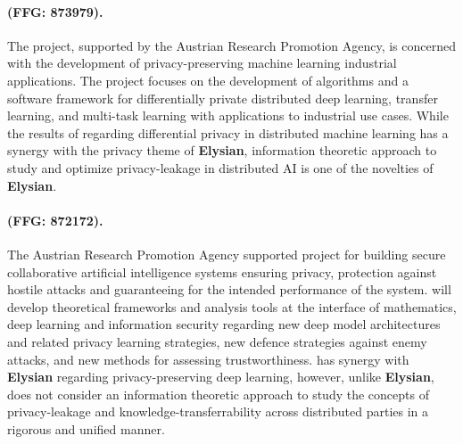 \documentclass[a4paper,11pt]{article}
\newcommand{\project}[1]{\textbf{#1}\xspace}
\newcommand{\SECURITY}{\project{Elysian}}
\newcommand{\TheProject}{\SECURITY}
\begin{document}
\begin{mdframed}[backgroundcolor=blue!5]
\paragraph{\primal (FFG: 873979).}
The \primal project, supported by the Austrian Research Promotion Agency, is concerned with the development of privacy-preserving machine learning industrial applications. The project focuses on the development of algorithms and a software framework for differentially private distributed deep learning, transfer learning, and multi-task learning with applications to industrial use cases. While the results of \primal regarding differential privacy in distributed machine learning has a synergy with the privacy theme of \TheProject{}, information theoretic approach to study and optimize privacy-leakage in distributed AI is one of the novelties of \TheProject{}.
\end{mdframed}

\begin{mdframed}[backgroundcolor=blue!5]
\paragraph{\sthreeai (FFG: 872172).} The Austrian Research Promotion Agency supported \sthreeai project for building secure collaborative artificial intelligence systems ensuring privacy, protection against hostile attacks and guaranteeing for the intended performance of the system. \sthreeai will develop theoretical frameworks and analysis tools at the interface of mathematics, deep learning and information security regarding new deep model architectures and related privacy learning strategies, new defence strategies against enemy attacks, and new methods for assessing trustworthiness. \sthreeai has synergy with \TheProject{} regarding privacy-preserving deep learning, however, unlike \TheProject{}, \sthreeai does not consider an information theoretic approach to study the concepts of privacy-leakage and knowledge-transferrability across distributed parties in a rigorous and unified manner.    
\end{mdframed}
\end{document}
